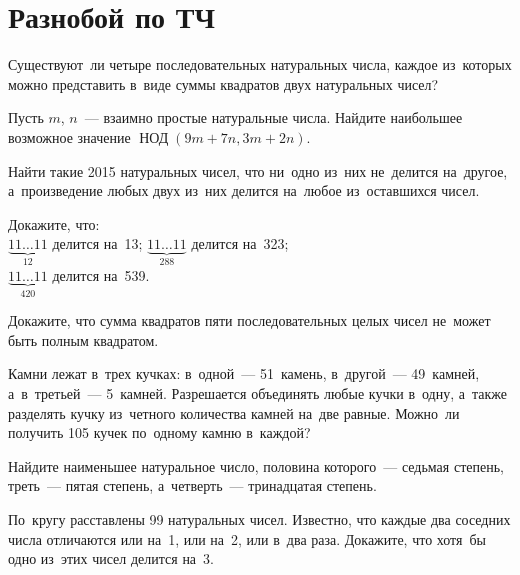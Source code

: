 

\section*{Разнобой по ТЧ}


\begin{problems}

\item
Существуют~ли четыре последовательных натуральных числа, каждое из~которых
можно представить в~виде суммы квадратов двух натуральных чисел?

\item
Пусть $m$, $n$~--- взаимно простые натуральные числа.
Найдите наибольшее возможное значение
$\operatorname{\text{НОД}}(9 m + 7 n, 3 m + 2 n)$.

\item
Найти такие 2015 натуральных чисел, что ни~одно из~них не~делится на~другое,
а~произведение любых двух из~них делится на~любое из~оставшихся чисел.

\item
Докажите, что:
\\[0.5ex]
\subproblem
$\underbrace{11 \ldots 11}_{12}$ делится на~13;
\qquad
\subproblem
$\underbrace{11 \ldots 11}_{288}$ делится на~323;
\\[0.5ex]
\subproblem
$\underbrace{11 \ldots 11}_{420}$ делится на~539.

\item
Докажите, что сумма квадратов пяти последовательных целых чисел не~может быть
полным квадратом.

\item
Камни лежат в~трех кучках: в~одной~--- 51~камень, в~другой~--- 49~камней,
а~в~третьей~--- 5~камней.
Разрешается объединять любые кучки в~одну, а~также разделять кучку из~четного
количества камней на~две равные.
Можно~ли получить 105 кучек по~одному камню в~каждой?

\item
Найдите наименьшее натуральное число, половина которого~--- седьмая степень,
треть~--- пятая степень, а~четверть~--- тринадцатая степень.

\item
По~кругу расставлены 99 натуральных чисел.
Известно, что каждые два соседних числа отличаются или на~1, или на~2,
или в~два раза.
Докажите, что хотя~бы одно из~этих чисел делится на~3.


\end{problems}
